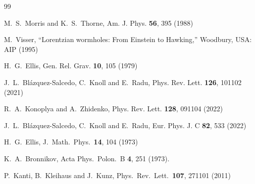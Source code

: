 \documentclass[floats,floatfix,showpacs,amssymb,prd,superscriptaddress,nofootinbib,nolongbibliography,reprint]{revtex4-2}
\begin{document}
\begin{thebibliography}{99}

M.~S.~Morris and K.~S.~Thorne,
Am. J. Phys. \textbf{56}, 395 (1988)


M.~Visser,
``Lorentzian wormholes: From Einstein to Hawking,''
Woodbury, USA: AIP (1995) %


H.~G.~Ellis,
Gen. Rel. Grav. \textbf{10}, 105 (1979)




J.~L.~Bl\'azquez-Salcedo, C.~Knoll and E.~Radu,
Phys. Rev. Lett. \textbf{126}, 101102 (2021)

R.~A.~Konoplya and A.~Zhidenko,
Phys. Rev. Lett. \textbf{128}, 091104 (2022)

J.~L.~Bl{\'a}zquez-Salcedo, C.~Knoll and E.~Radu,
Eur. Phys. J. C \textbf{82}, 533 (2022)




  H.~G.~Ellis,
  J.\ Math.\ Phys.\  {\bf 14}, 104 (1973)

  K.~A.~Bronnikov,
  Acta Phys.\ Polon.\ B {\bf 4}, 251 (1973).

  P.~Kanti, B.~Kleihaus and J.~Kunz,
  Phys.\ Rev.\ Lett.\  {\bf 107}, 271101 (2011)



\end{thebibliography}
\end{document}
